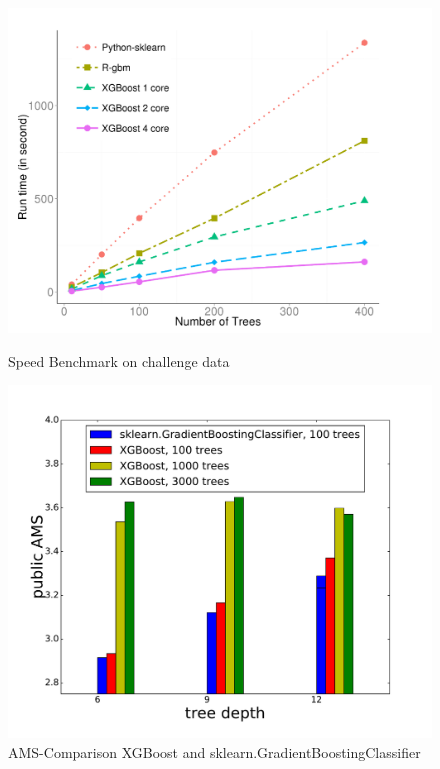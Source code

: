 \begin{figure}[h]
\centering
\begin{minipage}{0.48\textwidth}
  \centering
  \includegraphics[width=\linewidth]{images/xgboost-speed}
  \vspace{-0.1ex}
	\caption{Speed Benchmark on challenge data \cite{chen14}}
	\label{fig:xgb-speed}
\end{minipage}
\quad
\begin{minipage}{0.48\textwidth}
  \centering
  \includegraphics[width=\linewidth]{images/xgb-gbc}
	\caption{AMS-Comparison XGBoost and sklearn.GradientBoostingClassifier}
	\label{fig:xgb-gbc}
\end{minipage}
\end{figure}

